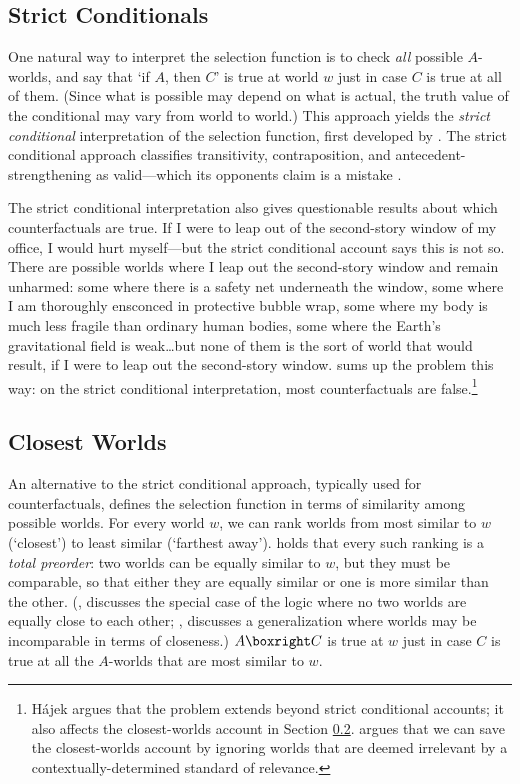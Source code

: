 \subsection{Strict Conditionals}
\label{strict}

One natural way to interpret the selection function is to check \emph{all} possible $A$-worlds, and say that `if $A$, then $C$' is true at world $w$ just in case $C$ is true at all of them.  (Since what is possible may depend on what is actual, the truth value of the conditional may vary from world to world.)  This approach yields the \emph{strict conditional} interpretation of the selection function, first developed by \citet{lewis-survey}.  The strict conditional approach classifies transitivity, contraposition, and antecedent-strengthening as valid---which its opponents claim is a mistake \citep[see][4--12]{lewis-counterfactuals}.

The strict conditional interpretation also gives questionable results about which counterfactuals are true.  If I were to leap out of the second-story window of my office, I would hurt myself---but the strict conditional account says this is not so.  There are possible worlds where I leap out the second-story window and remain unharmed: some where there is a safety net underneath the window, some where I am thoroughly ensconced in protective bubble wrap, some where my body is much less fragile than ordinary human bodies, some where the Earth's gravitational field is weak\ldots but none of them is the sort of world that would result, if I were to leap out the second-story window.  \citet{HajekManuscript-HJEMCA} sums up the problem this way: on the strict conditional interpretation, most counterfactuals are false.\footnote{H\'ajek argues that the problem extends beyond strict conditional accounts; it also affects the closest-worlds account in Section \ref{closest}.  \citet{Lewis2015-LEWEC} argues that we can save the closest-worlds account by ignoring worlds that are deemed irrelevant by a contextually-determined standard of relevance.}

\subsection{Closest Worlds}
\label{closest}

An alternative to the strict conditional approach, typically used for counterfactuals, defines the selection function in terms of similarity among possible worlds.  For every world $w$, we can rank worlds from most similar to $w$ (`closest') to least similar (`farthest away').  \citet{lewis-counterfactuals} holds that every such ranking is a \emph{total preorder}: two worlds can be equally similar to $w$, but they must be comparable, so that either they are equally similar or one is more similar than the other.  (\citealp{stalnaker:conditionals}, discusses the special case of the logic where no two worlds are equally close to each other; \citealp{Pollock1976-POLTPW}, discusses a generalization where worlds may be incomparable in terms of closeness.)  $A \boxright C$ is true at $w$ just in case $C$ is true at all the $A$-worlds that are most similar to $w$.

